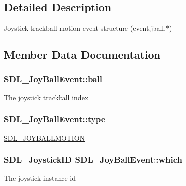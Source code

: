 \subsection{Detailed Description}
Joystick trackball motion event structure (event.\+jball.$\ast$) 

\subsection{Member Data Documentation}
\hypertarget{struct_s_d_l___joy_ball_event_add4eb0daeaf95ae56e8c7cfcec560242}{}
\subsubsection[{ball}]{ S\+D\+L\+\_\+\+Joy\+Ball\+Event\+::ball}\label{struct_s_d_l___joy_ball_event_add4eb0daeaf95ae56e8c7cfcec560242}
The joystick trackball index \hypertarget{struct_s_d_l___joy_ball_event_a0b192b95a043cb494b27ed9b27e84db1}{}
\subsubsection[{type}]{ S\+D\+L\+\_\+\+Joy\+Ball\+Event\+::type}\label{struct_s_d_l___joy_ball_event_a0b192b95a043cb494b27ed9b27e84db1}
\hyperlink{_s_d_l__events_8h_a3b589e89be6b35c02e0dd34a55f3fccaa78f859489cfd565c305c7f6f9d5b25c1}{S\+D\+L\+\_\+\+J\+O\+Y\+B\+A\+L\+L\+M\+O\+T\+I\+O\+N} \hypertarget{struct_s_d_l___joy_ball_event_a4e2e185717d529167cd0bea21093c454}{}
\subsubsection[{which}]{\setlength{\rightskip}{0pt plus 5cm}S\+D\+L\+\_\+\+Joystick\+I\+D S\+D\+L\+\_\+\+Joy\+Ball\+Event\+::which}\label{struct_s_d_l___joy_ball_event_a4e2e185717d529167cd0bea21093c454}
The joystick instance id \hypertarget{struct_s_d_l___joy_ball_event_a959a8473aa1964e5e1778c27a9ffd261}{}
